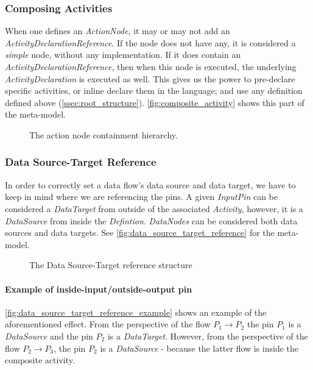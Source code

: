 \subsubsection{Composing Activities}\label{ssec:composing-activities}

When one defines an \emph{ActionNode}, it may or may not add an \emph{ActivityDeclarationReference}. If the node does not have any, it is considered a \emph{simple} node, without any implementation. If it does contain an \emph{ActivityDeclarationReference}, then when this node is executed, the underlying \emph{ActivityDeclaration} is executed as well. This gives us the power to pre-declare specific activities, or inline declare them in the language; and use any definition defined above (\autoref{ssec:root_structure}). \autoref{fig:composite_activity} shows this part of the meta-model.

\begin{figure}[!ht]
	\centering
	
	\caption{The action node containment hierarchy.}
	\label{fig:composite_activity}
\end{figure}

\subsubsection{Data Source-Target Reference}

In order to correctly set a data flow's data source and data target, we have to keep in mind where we are referencing the pins. A given \emph{InputPin} can be considered a \emph{DataTarget} from outside of the associated \emph{Activity}, however, it is a \emph{DataSource} from inside the \emph{Defintion}. \emph{DataNodes} can be considered both data sources and data targets. See \autoref{fig:data_source_target_reference} for the meta-model.

\begin{figure}[!ht]
	\centering
	
	\caption{The Data Source-Target reference structure}
	\label{fig:data_source_target_reference}
\end{figure}

\paragraph{Example of inside-input/outside-output pin} \autoref{fig:data_source_target_reference_example} shows an example of the aforementioned effect. From the perspective of the flow \(P_1 \rightarrow P_2\) the pin \(P_1\) is a \emph{DataSource} and the pin \(P_2\) is a \emph{DataTarget}. However, from the perspective of the flow \(P_2 \rightarrow P_3\), the pin \(P_2\) is a \emph{DataSource} - because the latter flow is inside the composite activity.

